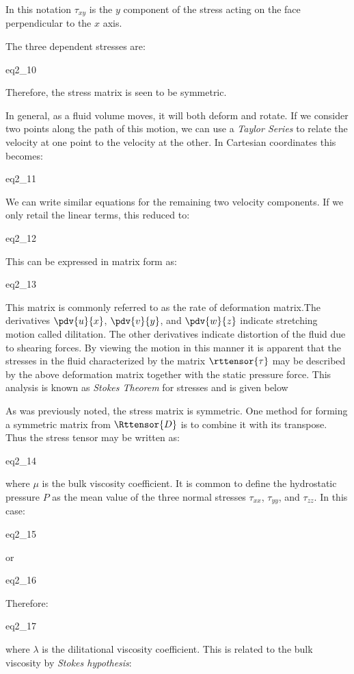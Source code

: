 In this notation $\tau_{xy}$ is the $y$ component of the stress acting on the
face perpendicular to the $x$ axis.

The three dependent stresses are:

{eq2_10}

Therefore, the stress matrix is seen to be symmetric.

In general, as a fluid volume moves, it will both deform and rotate. If we
consider two points along the path of this motion, we can use a {\it Taylor
Series} to relate the velocity at one point to the velocity at the other. In
Cartesian coordinates this becomes:

{eq2_11}

We can write similar equations for the remaining two velocity components. If we
only retail the linear terms, this reduced to:

{eq2_12}

This can be expressed in matrix form as:

{eq2_13}

This matrix is commonly referred to as the rate of deformation matrix.The
derivatives $\pdv{u}{x}$,
$\pdv{v}{y}$, and $\pdv{w}{z}$
indicate stretching motion called dilitation. The other derivatives indicate
distortion of the fluid due to shearing forces. By viewing the motion in this
manner it is apparent that the stresses in the fluid characterized by the
matrix $\rttensor{\tau}$ may be described by the above deformation matrix
together with the static pressure force. This analysis is known as {\it Stokes
Theorem} for stresses and is given below

As was previously noted, the stress matrix is symmetric. One method for forming
a symmetric matrix from $\Rttensor{D}$ is to combine it with its transpose. Thus
the stress tensor may be written as:

{eq2_14}

where $\mu$ is the bulk viscosity coefficient. It is common to define the
hydrostatic pressure $P$ as the mean value of the three normal stresses
$\tau_{xx}$, $\tau_{yy}$, and $\tau_{zz}$. In this case:

{eq2_15}

or

{eq2_16}

Therefore:

{eq2_17}

where $\lambda$ is the dilitational viscosity coefficient. This is related to
the bulk viscosity by {\it Stokes hypothesis}:

